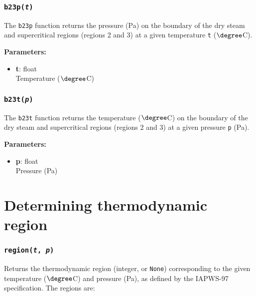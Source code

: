\begin{snugshade}
\subsubsection{\texttt{b23p(\emph{t})}}
\end{snugshade}
\label{sec:iapws97:b23p}

The \texttt{b23p} function returns the pressure (Pa) on the boundary of the dry steam and supercritical regions (regions 2 and 3) at a given temperature \texttt{t} ($\degree$C).

\textbf{Parameters:}
\begin{itemize}
\item \textbf{t}: float\\
  Temperature ($\degree$C)
\end{itemize}

\begin{snugshade}
\subsubsection{\texttt{b23t(\emph{p})}}
\end{snugshade}
\label{sec:iapws97:b23t}

The \texttt{b23t} function returns the temperature ($\degree$C) on the boundary of the dry steam and supercritical regions (regions 2 and 3) at a given pressure \texttt{p} (Pa).

\textbf{Parameters:}
\begin{itemize}
\item \textbf{p}: float\\
  Pressure (Pa)
\end{itemize}

\section{Determining thermodynamic region}

\begin{snugshade}
\subsubsection{\texttt{region(\emph{t}, \emph{p})}}
\end{snugshade}
\label{sec:iapws97:region}

Returns the thermodynamic region (integer, or \texttt{None}) corresponding to the given temperature ($\degree$C) and pressure (Pa), as defined by the IAPWS-97 specification. The regions are:

